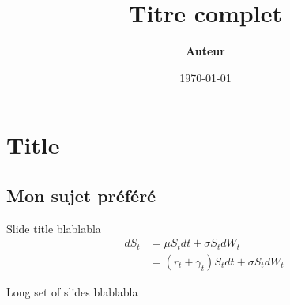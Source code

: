 \documentclass[compress]{beamer}
\title[Template]{Titre complet}
\author[Auteur]{\textbf {Auteur}}
\date{\today}
\begin{document}
	
	
	
	\begin{frame}
		\titlepage
	\end{frame}
	
	{
		\AtBeginSection{}
	}
	
\section{Title}

\subsection{Mon sujet préféré}



\begin{frame}{Slide title}
	blablabla
	\begin{align*}
		dS_t &= \mu S_t dt + \sigma S_t dW_t\\
		&= \left( r_t + \gamma_t \right) S_t dt + \sigma S_t dW_t\
	\end{align*}
\end{frame}

\begin{frame}[allowframebreaks]{Long set of slides}
	blablabla
\end{frame}

\appendix

\end{document}
